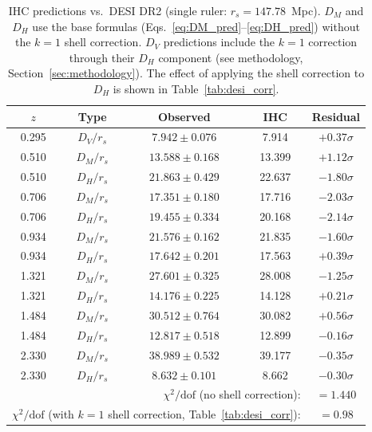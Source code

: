 \documentclass[12pt,a4paper]{article}
\begin{document}
\begin{table}[htbp]
\centering
\caption{IHC predictions vs.\ DESI DR2 (single ruler: $r_s = 147.78$~Mpc). $D_M$ and $D_H$ use the base formulas (Eqs.~\ref{eq:DM_pred}--\ref{eq:DH_pred}) without the $k=1$ shell correction. $D_V$ predictions include the $k=1$ correction through their $D_H$ component (see methodology, Section~\ref{sec:methodology}). The effect of applying the shell correction to $D_H$ is shown in Table~\ref{tab:desi_corr}.}
\label{tab:desi}
\small
\begin{tabular}{ccccc}
\toprule
$z$ & Type & Observed & IHC & Residual \\
\midrule
0.295 & $D_V/r_s$ & $7.942 \pm 0.076$ & 7.914 & $+0.37\sigma$ \\
0.510 & $D_M/r_s$ & $13.588 \pm 0.168$ & 13.399 & $+1.12\sigma$ \\
0.510 & $D_H/r_s$ & $21.863 \pm 0.429$ & 22.637 & $-1.80\sigma$ \\
0.706 & $D_M/r_s$ & $17.351 \pm 0.180$ & 17.716 & $-2.03\sigma$ \\
0.706 & $D_H/r_s$ & $19.455 \pm 0.334$ & 20.168 & $-2.14\sigma$ \\
0.934 & $D_M/r_s$ & $21.576 \pm 0.162$ & 21.835 & $-1.60\sigma$ \\
0.934 & $D_H/r_s$ & $17.642 \pm 0.201$ & 17.563 & $+0.39\sigma$ \\
1.321 & $D_M/r_s$ & $27.601 \pm 0.325$ & 28.008 & $-1.25\sigma$ \\
1.321 & $D_H/r_s$ & $14.176 \pm 0.225$ & 14.128 & $+0.21\sigma$ \\
1.484 & $D_M/r_s$ & $30.512 \pm 0.764$ & 30.082 & $+0.56\sigma$ \\
1.484 & $D_H/r_s$ & $12.817 \pm 0.518$ & 12.899 & $-0.16\sigma$ \\
2.330 & $D_M/r_s$ & $38.989 \pm 0.532$ & 39.177 & $-0.35\sigma$ \\
2.330 & $D_H/r_s$ & $8.632 \pm 0.101$ & 8.662 & $-0.30\sigma$ \\
\midrule
\multicolumn{4}{r}{$\chi^2/\mathrm{dof}$ (no shell correction):} & $= 1.440$ \\
\multicolumn{4}{r}{$\chi^2/\mathrm{dof}$ (with $k=1$ shell correction, Table~\ref{tab:desi_corr}):} & $= 0.98$ \\
\bottomrule
\end{tabular}
\end{table}
\end{document}
